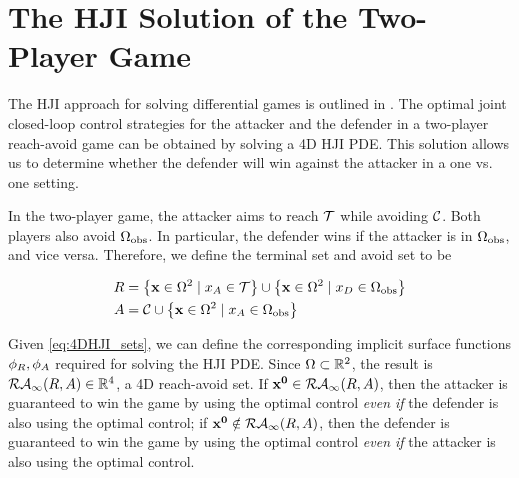 \section{The HJI Solution of the Two-Player Game} \label{sec:solution_hji}
The HJI approach for solving differential games is outlined in \cite{Huang2011,j:mitchell-TAC-2005, LSToolbox}. The optimal joint closed-loop control strategies for the attacker and the defender in a two-player reach-avoid game can be obtained by solving a 4D HJI PDE. This solution allows us to determine whether the defender will win against the attacker in a one vs. one setting. 

In the two-player game, the attacker aims to reach $\mathcal{T}$ while avoiding $\mathcal{C}$. Both players also avoid $\Omega_{\text{obs}}$. In particular, the defender wins if the attacker is in $\Omega_{\text{obs}}$, and vice versa. Therefore, we define the terminal set and avoid set to be

\begin{equation} \label{eq:4DHJI_sets}
\begin{aligned}
R &= \left\{\xj\in\amb^2 \mid \xa\in\target \right\} \cup \left\{\xj\in\amb^2\mid \xb\in\obs \right\} \\
A &= \avoid \cup \left\{\xj\in\amb^2\mid \xa\in\obs \right\}
\end{aligned} 
\end{equation}

Given \eqref{eq:4DHJI_sets}, we can define the corresponding implicit surface functions $\phi_R,\phi_A$ required for solving the HJI PDE. Since $\Omega\subset\mathbb{R}^2$, the result is $\mathcal{RA}_\infty(R,A)\in\mathbb{R}^4$, a 4D reach-avoid set. If $\mathbf{x^0}\in\mathcal{RA}_\infty(R,A)$, then the attacker is guaranteed to win the game by using the optimal control \textit{even if} the defender is also using the optimal control; if $\mathbf{x^0}\notin\mathcal{RA}_\infty(R,A)$, then the defender is guaranteed to win the game by using the optimal control \textit{even if} the attacker is also using the optimal control.